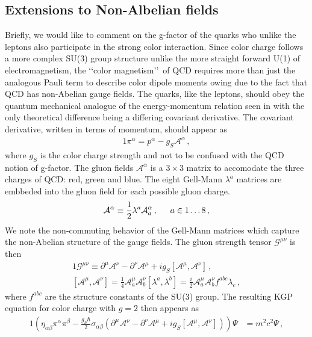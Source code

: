 \subsection{Extensions to Non-Albelian fields}
Briefly, we would like to comment on the g-factor of the quarks who unlike the leptons also participate in the strong color interaction. Since color charge follows a more complex SU(3) group structure unlike the more straight forward U(1) of electromagnetism, the \lq\lq color magnetism\rq\rq\ of QCD requires more than just the analogous Pauli term to describe color dipole moments owing due to the fact that QCD has non-Abelian gauge fields. The quarks, like the leptons, should obey the quantum mechanical analogue of the energy-momentum relation seen in  with the only theoretical difference being a differing covariant derivative. The covariant derivative, written in terms of momentum, should appear as
\begin{alignat}{1}
	\label{eq:spin:08} \pi^{\alpha}=p^{\alpha}-g_{S}\mathcal{A}^{\alpha}\,,
\end{alignat}
where $g_{S}$ is the color charge strength and not to be confused with the QCD notion of g-factor. The gluon fields $\mathcal{A}^{\alpha}$ is a $3\times3$ matrix to accomodate the three charges of QCD: red, green and blue. The eight Gell-Mann $\lambda^{a}$ matrices are embbeded into the gluon field for each possible gluon charge.
\begin{alignat}{1}
	\label{eq:spin:09} \mathcal{A}^{\alpha}\equiv\frac{1}{2}\lambda^{a}\mathcal{A}^{\alpha}_{a}\,,\indent a\in1\ldots8\,,
\end{alignat}
We note the non-commuting behavior of the Gell-Mann matrices which capture the non-Abelian structure of the gauge fields. The gluon strength tensor $\mathcal{G}^{\mu\nu}$ is then
\begin{alignat}{1}
	\label{eq:spin:10a} \mathcal{G}^{\mu\nu}\equiv\partial^{\mu}\mathcal{A}^{\nu}-\partial^{\nu}\mathcal{A}^{\mu}+ig_{S}\left[\mathcal{A}^{\mu},\mathcal{A}^{\nu}\right]\,,\\
	\label{eq:spin:10b} \left[\mathcal{A}^{\mu},\mathcal{A}^{\nu}\right] = \frac{1}{4}\mathcal{A}^{\mu}_{a}\mathcal{A}^{\nu}_{b}\left[\lambda^{a},\lambda^{b}\right]=\frac{i}{2}\mathcal{A}^{\mu}_{a}\mathcal{A}^{\nu}_{b}f^{abc}\lambda_{c}\,,
\end{alignat}
where $f^{abc}$ are the structure constants of the SU(3) group. The resulting KGP equation for color charge with $g=2$ then appears as
\begin{alignat}{1}
	\label{eq:spin:11} \left(\eta_{\alpha\beta}\pi^{\alpha}\pi^{\beta}-\frac{g_{S}\hbar}{2}\sigma_{\alpha\beta}\left(\partial^{\mu}\mathcal{A}^{\nu}-\partial^{\nu}\mathcal{A}^{\mu}+ig_{S}\left[\mathcal{A}^{\mu},\mathcal{A}^{\nu}\right]\right)\right)\Psi&=m^{2}c^{2}\Psi\,,
\end{alignat}
